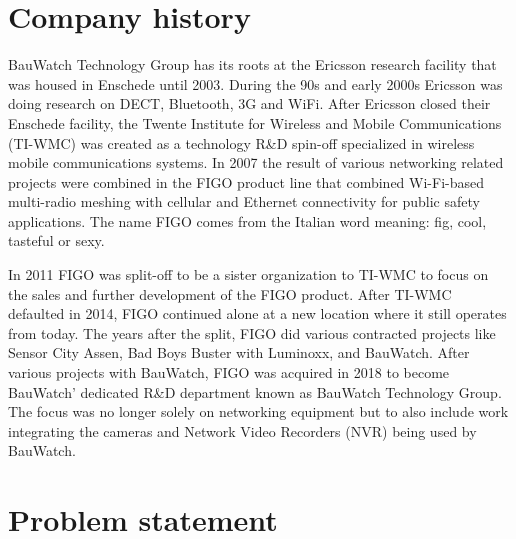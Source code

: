 \section{Company history}
BauWatch Technology Group has its roots at the Ericsson research facility that was housed in Enschede until 2003. During the 90s and early 2000s Ericsson was doing
research on DECT, Bluetooth, 3G and WiFi. After Ericsson closed their Enschede facility, the Twente Institute for Wireless and Mobile Communications (TI-WMC) was created as a technology R\&D spin-off specialized in wireless mobile communications systems. In 2007 the result of various networking related projects were combined in the FIGO product line that combined Wi-Fi-based multi-radio meshing with cellular and Ethernet connectivity for public safety applications\cite{noauthor_twente_nodate}. The name FIGO comes from the Italian word meaning: fig, cool, tasteful or sexy.

In 2011 FIGO was split-off to be a sister organization to TI-WMC to focus on the sales and further development of the FIGO product.
After TI-WMC defaulted in 2014, FIGO continued alone at a new location where it still operates from today. 
The years after the split, FIGO did various contracted projects like Sensor City Assen, Bad Boys Buster with Luminoxx, and BauWatch.
After various projects with BauWatch, FIGO was acquired in 2018 to become BauWatch' dedicated R\&D department known as BauWatch Technology Group.
The focus was no longer solely on networking equipment but to also include work integrating the cameras and Network Video Recorders (NVR) being used by BauWatch.

\section{Problem statement}



